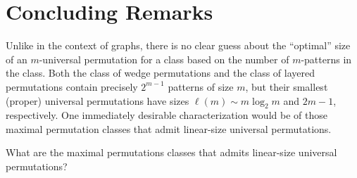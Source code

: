 \section{Concluding Remarks}

Unlike in the context of graphs, there is no clear guess about the ``optimal'' size of an $m$-universal permutation for a class based on the number of $m$-patterns in the class. Both the class of wedge permutations and the class of layered permutations contain precisely $2^{m-1}$ patterns of size $m$, but their smallest (proper) universal permutations have sizes $\ell(m) \sim m \log_2 m$ and $2m-1$, respectively. One immediately desirable characterization would be of those maximal permutation classes that admit linear-size universal permutations. 
\begin{question}
	What are the maximal permutations classes that admits linear-size universal permutations?
\end{question}
